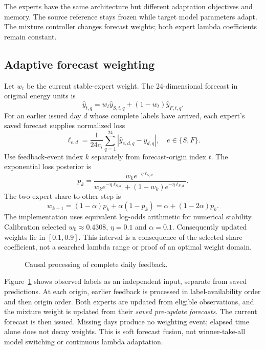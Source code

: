 \documentclass[pdflatex,iicol,sn-mathphys-num]{sn-jnl}
\begin{document}
The experts have the same architecture but different adaptation objectives and memory. The source reference stays frozen while target model parameters adapt. The mixture controller changes forecast weights; both expert lambda coefficients remain constant.

\subsection{Adaptive forecast weighting}
Let $w_t$ be the current stable-expert weight. The 24-dimensional forecast in original energy units is
\begin{equation}
\hat y_{t,q}=w_t\hat y_{S,t,q}+(1-w_t)\hat y_{F,t,q}.
\label{eq:mixture}\end{equation}
For an earlier issued day $d$ whose complete labels have arrived, each expert's saved forecast supplies normalized loss
\begin{equation}
\ell_{e,d}=\frac{1}{24c_i}\sum_{q=1}^{24}|\hat y_{e,d,q}-y_{d,q}|,
\quad e\in\{S,F\}.
\label{eq:feedbackloss}\end{equation}
Use feedback-event index $k$ separately from forecast-origin index $t$. The exponential loss posterior is
\begin{equation}
p_k=\frac{w_k e^{-\eta\ell_{S,d}}}
{w_k e^{-\eta\ell_{S,d}}+(1-w_k)e^{-\eta\ell_{F,d}}}.
\label{eq:posterior}\end{equation}
The two-expert share-to-other step \cite{herbster1998} is
\begin{equation}
w_{k+1}=(1-\alpha)p_k+\alpha(1-p_k)
=\alpha+(1-2\alpha)p_k.
\label{eq:share}\end{equation}
The implementation uses equivalent log-odds arithmetic for numerical stability. Calibration selected $w_0\approx0.4308$, $\eta=0.1$ and $\alpha=0.1$. Consequently updated weights lie in $[0.1,0.9]$. This interval is a consequence of the selected share coefficient, not a searched lambda range or proof of an optimal weight domain.

\begin{figure}[t]
\centering

\caption{Causal processing of complete daily feedback.}\label{fig:feedback}
\end{figure}

Figure~\ref{fig:feedback} shows observed labels as an independent input, separate from saved predictions. At each origin, earlier feedback is processed in label-availability order and then origin order. Both experts are updated from eligible observations, and the mixture weight is updated from their \emph{saved pre-update forecasts}. The current forecast is then issued. Missing days produce no weighting event; elapsed time alone does not decay weights. This is soft forecast fusion, not winner-take-all model switching or continuous lambda adaptation.
\end{document}
